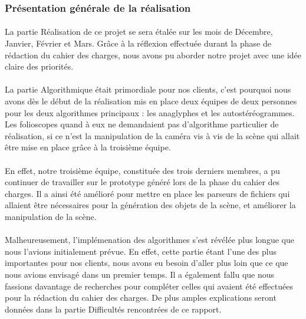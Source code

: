 \subsubsection{Présentation générale de la réalisation}
\paragraph{}
La partie Réalisation de ce projet se sera étalée sur les mois de Décembre, Janvier, Février et Mars. Grâce à la réflexion effectuée durant la phase de rédaction du cahier des charges, nous avons pu aborder notre projet avec une idée claire des priorités.

\paragraph{}
La partie Algorithmique était primordiale pour nos clients, c'est pourquoi nous avons dès le début de la réalisation mis en place deux équipes de deux personnes pour les deux algorithmes principaux : les anaglyphes et les autostéréogrammes. Les folioscopes quand à eux ne demandaient pas d'algorithme particulier de réalisation, si ce n'est la manipulation de la caméra vis à vis de la scène qui allait être mise en place grâce à la troisième équipe.

\paragraph{}
En effet, notre troisième équipe, constituée des trois derniers membres, a pu continuer de travailler sur le prototype généré lors de la phase du cahier des charges. Il a ainsi été amélioré pour mettre en place les parseurs de fichiers qui allaient être nécessaires pour la génération des objets de la scène, et améliorer la manipulation de la scène.

\paragraph{}
Malheureusement, l'implémenation des algorithmes s'est révélée plus longue que nous l'avions initialement prévue. En effet, cette partie étant l'une des plus importantes pour nos clients, nous avons eu besoin d'aller plus loin que ce que nous avions envisagé dans un premier temps. Il a également fallu que nous fassions davantage de recherches pour compléter celles qui avaient été effectuées pour la rédaction du cahier des charges. De plus amples explications seront données dans la partie Difficultés rencontrées de ce rapport. 


